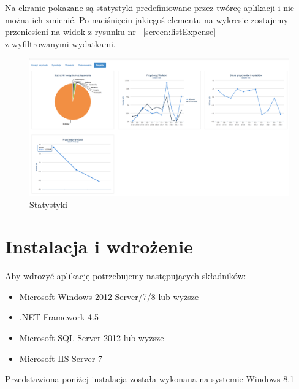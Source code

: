 \documentclass[10pt,titlepage]{article}
\begin{document}
Na ekranie pokazane są statystyki predefiniowane przez twórcę aplikacji i nie można ich zmienić. Po naciśnięciu jakiegoś elementu na wykresie zostajemy przeniesieni na widok z rysunku nr ~\ref{screen:listExpense} \\ z wyfiltrowanymi wydatkami.
\begin{figure}[H]
  \centering
  \includegraphics[scale=0.2]{images/screen_statystyki.png}
  \caption{Statystyki}
\end{figure}
\section{Instalacja i wdrożenie}
Aby wdrożyć aplikację potrzebujemy następujących składników:
\begin{itemize}
  \item Microsoft Windows 2012 Server/7/8 lub wyższe
  \item .NET Framework 4.5
  \item Microsoft SQL Server 2012 lub wyższe
  \item Microsoft IIS Server 7
\end{itemize}
Przedstawiona poniżej instalacja została wykonana na systemie Windows 8.1
\end{document}
